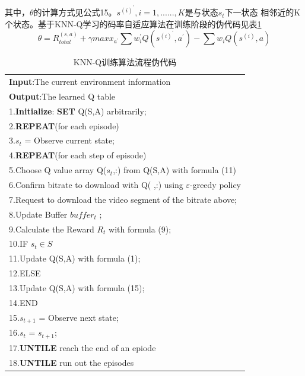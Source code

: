 \documentclass[twocolumn]{article}
\renewcommand\arraystretch{1.2}
\begin{document}
其中，$\theta$的计算方式见公式15。$s^{(i)^{\prime}},i=1,......,K$是与状态$s_{t}$下一状态
相邻近的K个状态。基于KNN-Q学习的码率自适应算法在训练阶段的伪代码见表\ref{KNN-Q training}
\begin{equation}
\theta=R_{total}^{(s,a)}+\gamma max x_{a^\prime}\sum w_{i}^{\prime}Q(s^{(i)^{\prime}},a^{\prime})-\sum w_{i}Q(s^{(i)},a)
\end{equation}
\begin{table}[htbp]
\renewcommand\arraystretch{0.8}
\centering
\caption{KNN-Q训练算法流程伪代码}
\label{KNN-Q training}
\begin{tabular}{l}
\toprule 
\textbf{Input}:The current environment information\\
\textbf{Output}:The learned Q table\\
\midrule 
1.\textbf{Initialize}:  \textbf{SET} Q(S,A) arbitrarily;\\
2.\textbf{REPEAT}(for each episode)\\     
3.\hspace{1cm}$s_{t}$ = Observe current state;\\
4.\hspace{1cm}\textbf{REPEAT}(for each step of episode)\\
5.\hspace{2cm}Choose Q value array Q($s_{t}$,:) from Q(S,A) with formula (11)\\
6.\hspace{2cm}Confirm bitrate to download with Q( ,:) using $\varepsilon$-greedy policy\\
7.\hspace{2cm}Request to download the video segment of the bitrate above;\\
8.\hspace{2cm}Update Buffer $buffer_{t}$ ;\\
9.\hspace{2cm}Calculate the Reward $R_{t}$ with formula (9); \\
10.\hspace{2cm}IF $s_{t}\in S$ \\
11.\hspace{3cm}Update Q(S,A) with formula (1);\\
12.\hspace{2cm}ELSE\\
13.\hspace{3cm}Update Q(S,A) with formula (15);\\
14.\hspace{2cm}END\\
15.\hspace{2cm}$s_{t+1}$ = Observe next state;\\
16.\hspace{2cm}$s_{t}$ = $s_{t+1}$;\\
17.\hspace{1cm}\textbf{UNTILE} reach the end of an epiode\\
18.\textbf{UNTILE} run out the episodes\\
\bottomrule 
\end{tabular}
\end{table}
\end{document}
